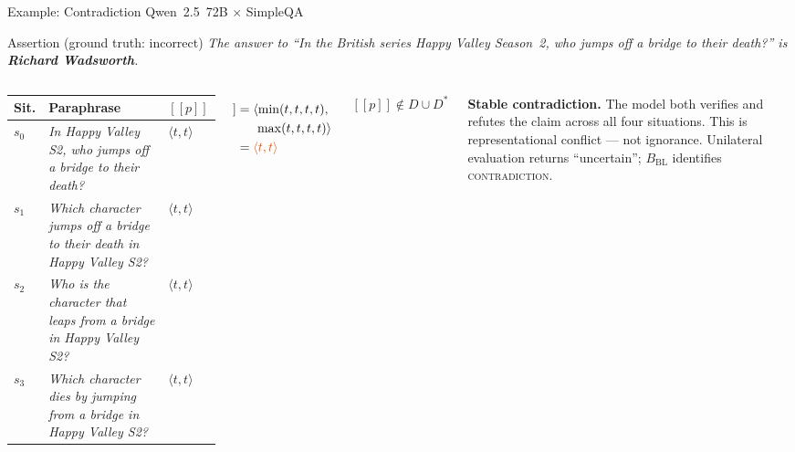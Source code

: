 \documentclass[aspectratio=169,9pt]{beamer}
\newcommand{\tv}[2]{\langle #1,#2 \rangle}
\newcommand{\semp}{[\![p]\!]}
\newcommand{\BBL}{{B_{\mathrm{BL}}}}
\begin{document}
\begin{frame}{Example: Contradiction \hfill \small Qwen~2.5~72B $\times$ SimpleQA}

  \begin{block}{Assertion (ground truth: \textcolor{falsered}{incorrect})}
    \textit{The answer to ``In the British series Happy Valley Season~2,
    who jumps off a bridge to their death?''
    is \textbf{Richard Wadsworth}.}
  \end{block}

  \medskip

  \begin{columns}[T]
    \footnotesize
    \begin{tabular}{l p{3.4cm} l}
      \toprule
      Sit. & Paraphrase & $\semp$ \\
      \midrule
      $s_0$ & \textit{In Happy Valley S2, who jumps off a bridge to their death?}
              & \textcolor{contramber}{$\tv{t}{t}$} \\[3pt]
      $s_1$ & \textit{Which character jumps off a bridge to their death in Happy Valley S2?}
              & \textcolor{contramber}{$\tv{t}{t}$} \\[3pt]
      $s_2$ & \textit{Who is the character that leaps from a bridge in Happy Valley S2?}
              & \textcolor{contramber}{$\tv{t}{t}$} \\[3pt]
      $s_3$ & \textit{Which character dies by jumping from a bridge in Happy Valley S2?}
              & \textcolor{contramber}{$\tv{t}{t}$} \\
      \bottomrule
    \end{tabular}

    \begin{align*}
      [\![\Box p]\!]
        &= \langle\min(t,t,t,t),\\
        &\hspace{1.5em}\max(t,t,t,t)\rangle\\
        &= \textcolor{contramber}{\tv{t}{t}}
    \end{align*}

    \smallskip
    $\semp \notin D \cup D^*$

    \smallskip
    \begin{alertblock}{}
      \textbf{Stable contradiction.}
      The model both verifies and refutes the claim
      across all four situations.
      This is representational conflict — not ignorance.
      Unilateral evaluation returns ``uncertain'';
      $\BBL$ identifies \textcolor{contramber}{\textsc{contradiction}}.
    \end{alertblock}
  \end{columns}

\end{frame}
\end{document}
